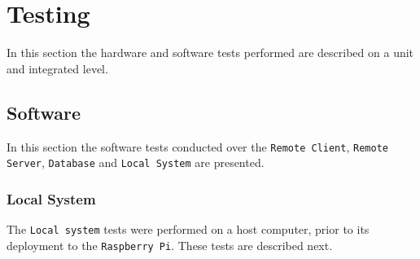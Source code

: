 \chapter{Testing}
\label{cha:testing}
In this section the hardware and software tests performed are described on a
unit and integrated level.

\section{Software}
\label{sec:software}
In this section the software tests conducted over the \texttt{Remote Client},
\texttt{Remote Server}, \texttt{Database} and \texttt{Local System} are presented.

\subsection{Local System}
\label{sec:local-system}
The \texttt{Local system} tests were performed on a host computer, prior to its
deployment to the \texttt{Raspberry Pi}. These tests are described next.

